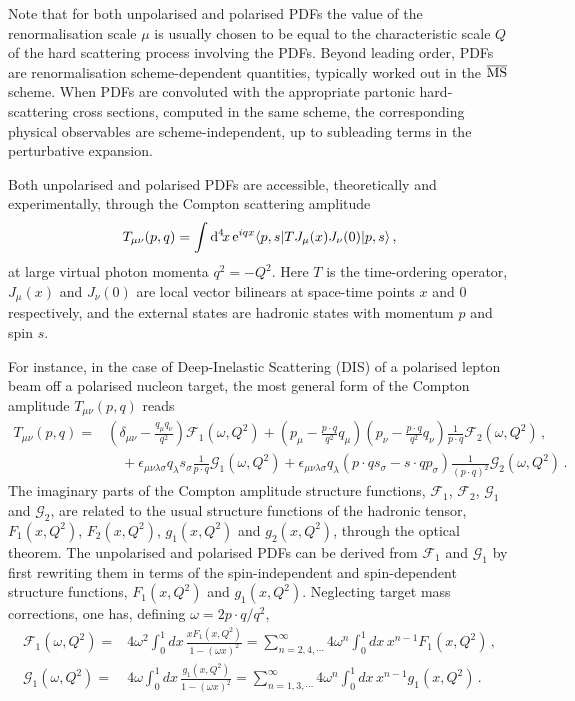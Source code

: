 Note that for both unpolarised and polarised PDFs the value of the 
renormalisation scale $\mu$ is usually chosen to be equal to the characteristic 
scale $Q$ of the hard scattering process involving the PDFs.
%
Beyond leading order, PDFs are renormalisation scheme-dependent 
quantities, typically worked out in the $\overline{\rm MS}$ scheme.
%
When PDFs are convoluted with the appropriate partonic hard-scattering 
cross sections, computed in the same scheme, the corresponding physical 
observables are scheme-independent, up to subleading terms in the perturbative 
expansion. 

Both unpolarised and polarised PDFs are accessible, theoretically and 
experimentally, through the Compton scattering amplitude
\begin{equation}
\label{eq:Compton}
T_{\mu\nu}(p,q) 
= 
\int {\rm d}^4\!x\, {\rm e}^{iqx}  \langle p,s |T J_\mu(x) J_\nu(0)|p,s\rangle\, ,
\end{equation}
at large virtual photon momenta $q^2=-Q^2$. 
%
Here $T$ is the time-ordering operator, $J_\mu(x)$ and $J_\nu(0)$ are local 
vector bilinears at space-time points $x$ and $0$ respectively, and the 
external states are hadronic states with momentum $p$ and spin $s$.

For instance, in the case of Deep-Inelastic Scattering (DIS) of a 
polarised lepton beam off a polarised nucleon target, the 
most general form of the Compton amplitude $T_{\mu\nu}(p,q)$ reads
\begin{align}
T_{\mu\nu}(p,q) 
= {} & 
  \left(\delta_{\mu\nu}-\frac{q_\mu q_\nu}{q^2}\right)\mathcal{F}_1(\omega,Q^2) 
+ \left(p_\mu-\frac{p\cdot q}{q^2}q_\mu\right) \left(p_\nu-\frac{p\cdot q}{q^2}q_\nu\right) \frac{1}{p\cdot q} \mathcal{F}_2(\omega,Q^2)\,,\\ 
& {} \quad  
+ \epsilon_{\mu\nu\lambda\sigma}q_\lambda s_\sigma \frac{1}{p\cdot q}\mathcal{G}_1(\omega,Q^2)
+ \epsilon_{\mu\nu\lambda\sigma}q_\lambda \left(p\cdot q s_\sigma - s\cdot q p_\sigma\right) \frac{1}{(p\cdot q)^2}\mathcal{G}_2(\omega,Q^2)\,.
\end{align}
%
The imaginary parts of the Compton amplitude structure functions, 
$\mathcal{F}_1$, $\mathcal{F}_2$, $\mathcal{G}_1$ and $\mathcal{G}_2$, 
are related to the usual structure functions of the hadronic tensor, 
$F_1(x,Q^2)$, $F_2(x,Q^2)$, $g_1(x,Q^2)$ and $g_2(x,Q^2)$, 
through the optical theorem.
%
The unpolarised and polarised PDFs can be derived from $\mathcal{F}_1$ and 
$\mathcal{G}_1$ by first rewriting them in terms of the spin-independent 
and spin-dependent structure functions, $F_1(x,Q^2)$ and $g_1(x,Q^2)$.
%
Neglecting target mass corrections, one has, defining $\omega=2p\cdot q/q^2$,
\begin{align}
\mathcal{F}_1(\omega,Q^2) 
= {} & 4 \omega^2 \int_0^1 dx\,  \frac{xF_1(x,Q^2)}{1-(\omega x)^2} 
= \sum_{n=2,4,\cdots}^\infty 4\omega^n \int_0^1 dx\, x^{n-1} F_1(x,Q^2) \,, \\
\mathcal{G}_1(\omega,Q^2) 
= {} & 4 \omega \int_0^1 dx\, \frac{g_1(x,Q^2)}{1-(\omega x)^2} 
= \sum_{n=1,3,\cdots}^\infty 4\omega^n \int_0^1 dx\, x^{n-1} g_1(x,Q^2)\,.
\end{align}
%

